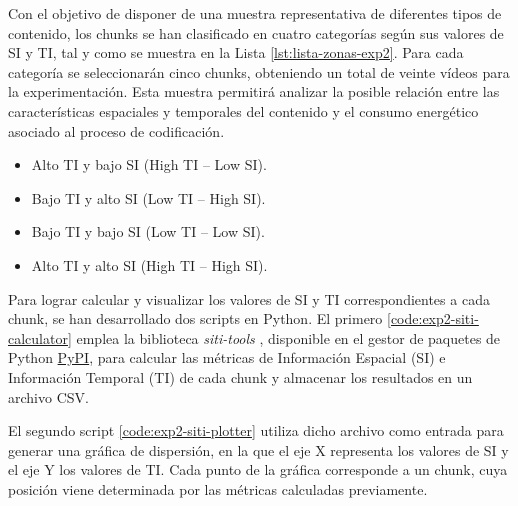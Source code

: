 Con el objetivo de disponer de una muestra representativa de diferentes tipos de contenido, los chunks se han clasificado en cuatro categorías según sus valores de SI y TI, tal y como se muestra en la Lista \ref{lst:lista-zonas-exp2}. Para cada categoría se seleccionarán cinco chunks, obteniendo un total de veinte vídeos para la experimentación. Esta muestra permitirá analizar la posible relación entre las características espaciales y temporales del contenido y el consumo energético asociado al proceso de codificación.\

\begin{itemize}
    \item Alto TI y bajo SI (High TI – Low SI).
    \item Bajo TI y alto SI (Low TI – High SI).
    \item Bajo TI y bajo SI (Low TI – Low SI).
    \item Alto TI y alto SI (High TI – High SI).
\end{itemize}\label{lst:lista-zonas-exp2}

Para lograr calcular y visualizar los valores de SI y TI correspondientes a cada chunk, se han desarrollado dos scripts en Python. El primero \ref{code:exp2-siti-calculator} emplea la biblioteca \textit{siti-tools} \cite{siti-tool-pypip}, disponible en el gestor de paquetes de Python \href{https://pypi.org/}{PyPI}, para calcular las métricas de Información Espacial (SI) e Información Temporal (TI) de cada chunk y almacenar los resultados en un archivo CSV.

El segundo script \ref{code:exp2-siti-plotter} utiliza dicho archivo como entrada para generar una gráfica de dispersión, en la que el eje X representa los valores de SI y el eje Y los valores de TI. Cada punto de la gráfica corresponde a un chunk, cuya posición viene determinada por las métricas calculadas previamente. 


